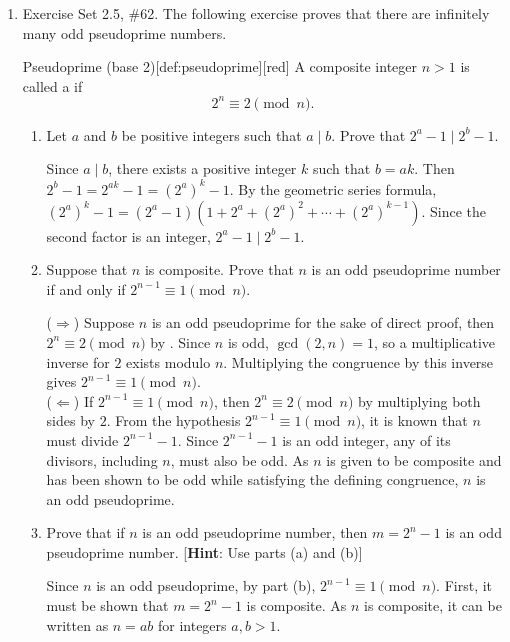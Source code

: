 \begin{enumerate}
  \newpage
  \item Exercise Set 2.5, \#62.
  The following exercise proves that there are infinitely many odd pseudoprime numbers.
  \begin{define}{Pseudoprime (base 2)}[def:pseudoprime][red]
  A composite integer $n>1$ is called a  if
  \[
  2^n\equiv 2\pmod n.
  \]
  \end{define}
  \begin{enumerate}
    \item Let $a$ and $b$ be positive integers such that $a \mid b$. 
    Prove that $2^a-1 \mid 2^b-1$.
    \begin{subprove}
      Since $a \mid b$, there exists a positive integer $k$ such that $b = ak$. 
      Then $2^b - 1 = 2^{ak} - 1 = (2^a)^k - 1$. 
      By the geometric series formula, $(2^a)^k - 1 = (2^a - 1)(1 + 2^a + (2^a)^2 + \cdots + (2^a)^{k-1})$.
      Since the second factor is an integer, $2^a - 1 \mid 2^b - 1$.
    \end{subprove}
    \item Suppose that $n$ is composite. Prove that $n$ is an odd pseudoprime number 
    if and only if $2^{n-1} \equiv 1 \pmod{n}$.
    \begin{subprove}
      ($\Rightarrow$) Suppose $n$ is an odd pseudoprime for the sake of direct proof, 
      then $2^n \equiv 2 \pmod{n}$ by . 
      Since $n$ is odd, $\gcd(2,n)=1$, so a multiplicative inverse for $2$ exists modulo $n$. 
      Multiplying the congruence by this inverse gives $2^{n-1} \equiv 1 \pmod{n}$.\vspace*{10px}\\
      ($\Leftarrow$) If $2^{n-1} \equiv 1 \pmod{n}$, then  $2^n \equiv 2 \pmod{n}$ by multiplying both sides by $2$. 
      From the hypothesis $2^{n-1} \equiv 1 \pmod{n}$, it is known that $n$ must divide $2^{n-1}-1$. 
      Since $2^{n-1}-1$ is an odd integer, any of its divisors, including $n$, must also be odd. 
      As $n$ is given to be composite and has been shown to be odd while satisfying the defining congruence, $n$ is an odd pseudoprime.
    \end{subprove}
    \item Prove that if $n$ is an odd pseudoprime number, 
    then $m=2^n-1$ is an odd pseudoprime number. 
    [\textbf{Hint}: Use parts (a) and (b)]
    \begin{subprove}
      Since $n$ is an odd pseudoprime, by part (b), $2^{n-1} \equiv 1 \pmod{n}$.
      First, it must be shown that $m=2^n-1$ is composite. As $n$ is composite, it can be written as $n=ab$ for integers $a,b>1$.

\end{subprove}
\end{enumerate}
\end{enumerate}
